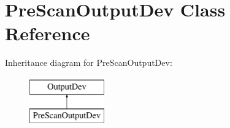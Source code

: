 \hypertarget{class_pre_scan_output_dev}{}\section{Pre\+Scan\+Output\+Dev Class Reference}
\label{class_pre_scan_output_dev}
Inheritance diagram for Pre\+Scan\+Output\+Dev\+:\begin{figure}[H]
\begin{center}
\leavevmode
\includegraphics[height=2.000000cm]{class_pre_scan_output_dev}
\end{center}
\end{figure}
